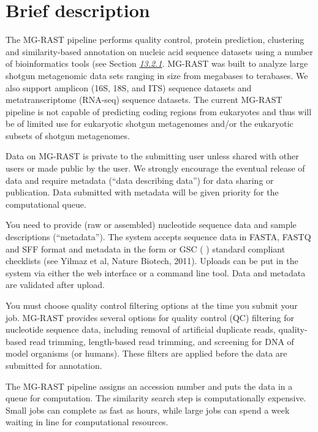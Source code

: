 \documentclass[letterpaper,10pt,english]{sphinxmanual}
\begin{document}
\section{Brief description}
\label{\detokenize{user_manual:brief-description}}\label{\detokenize{user_manual:section-brief-description}}
The MG-RAST pipeline performs quality control, protein prediction,
clustering and similarity-based annotation on nucleic acid sequence
datasets using a number of bioinformatics tools (see Section
{\hyperref[\detokenize{user_manual:section:bioinformatics-codes}]{\emph{13.2.1}}}. MG-RAST was built to analyze
large shotgun metagenomic data sets ranging in size from megabases to
terabases. We also support amplicon (16S, 18S, and ITS) sequence
datasets and metatranscriptome (RNA-seq) sequence datasets. The current
MG-RAST pipeline is not capable of predicting coding regions from
eukaryotes and thus will be of limited use for eukaryotic shotgun
metagenomes and/or the eukaryotic subsets of shotgun metagenomes.

Data on MG-RAST is private to the submitting user unless shared with
other users or made public by the user. We strongly encourage the
eventual release of data and require metadata (“data describing data”)
for data sharing or publication. Data submitted with metadata will be
given priority for the computational queue.

You need to provide (raw or assembled) nucleotide sequence data and
sample descriptions (“metadata”). The system accepts sequence data in
FASTA, FASTQ and SFF format and metadata in the form or GSC (
) standard compliant checklists (see Yilmaz et al, Nature Biotech,
2011). Uploads can be put in the system via either the web interface or
a command line tool. Data and metadata are validated after upload.

You must choose quality control filtering options at the time you submit
your job. MG-RAST provides several options for quality control (QC)
filtering for nucleotide sequence data, including removal of artificial
duplicate reads, quality-based read trimming, length-based read
trimming, and screening for DNA of model organisms (or humans). These
filters are applied before the data are submitted for annotation.

The MG-RAST pipeline assigns an accession number and puts the data in a
queue for computation. The similarity search step is computationally
expensive. Small jobs can complete as fast as hours, while large jobs
can spend a week waiting in line for computational resources.
\end{document}
